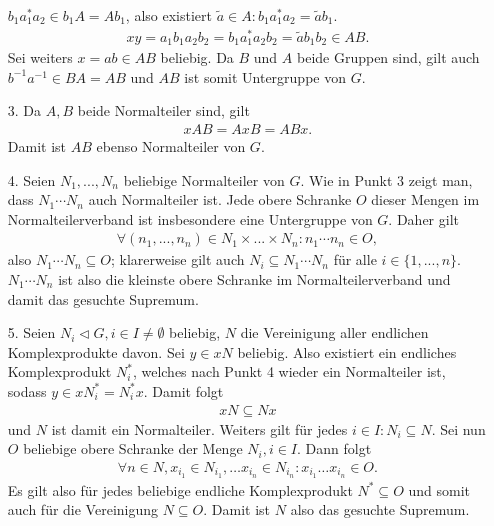 \begin{solution}
\begin{itemize}
  $b_1a_1^*a_2 \in b_1A = Ab_1$, also existiert $\widetilde{a} \in A: b_1a_1^*a_2 = \widetilde{a}b_1$.
  \begin{align*}
    xy = a_1b_1a_2b_2 = b_1a_1^*a_2b_2 = \widetilde{a}b_1b_2 \in AB.
  \end{align*}
  Sei weiters $x = ab \in AB$ beliebig. Da $B$ und $A$ beide Gruppen sind, gilt
  auch $b^{-1}a^{-1} \in BA = AB$ und $AB$ ist somit Untergruppe von $G$.
  \item [3.] Da $A,B$ beide Normalteiler sind, gilt
  \begin{align*}
    xAB = AxB = ABx.
  \end{align*}
  Damit ist $AB$ ebenso Normalteiler von $G$.
  \item [4.] Seien $N_1, ..., N_n$ beliebige Normalteiler von $G$. Wie in Punkt 3 zeigt man, dass $N_1\cdots N_n$ auch Normalteiler ist. Jede obere Schranke $O$ dieser Mengen im Normalteilerverband ist insbesondere eine Untergruppe von $G$. Daher gilt
  \begin{align*}
    \forall (n_1, ..., n_n) \in N_1 \times ... \times N_n: n_1\cdots n_n \in O,
  \end{align*}
  also $N_1\cdots N_n \subseteq O$;
  klarerweise gilt auch $N_i \subseteq N_1\cdots N_n$ für alle $i \in \{1,...,n\}$.
  $N_1\cdots N_n$ ist also die kleinste obere Schranke im Normalteilerverband und damit das gesuchte Supremum.
  \item [5.] Seien $N_i \vartriangleleft G, i \in I \neq \emptyset$ beliebig,
  $N$ die Vereinigung aller endlichen Komplexprodukte davon.
  Sei $y \in xN$ beliebig. Also existiert ein endliches Komplexprodukt $N_i^*$,
  welches nach Punkt 4 wieder ein Normalteiler ist, sodass $y \in xN_i^* = N_i^*x$.
  Damit folgt
  \begin{align*}
    xN \subseteq Nx
  \end{align*}
  und $N$ ist damit ein Normalteiler. Weiters gilt für jedes $i \in I: N_i \subseteq N$.
  Sei nun $O$ beliebige obere Schranke der Menge $N_i, i\in I$. Dann folgt
  \begin{align*}
    \forall n \in N, x_{i_1} \in N_{i_1},\dots x_{i_n} \in N_{i_n}: x_{i_1}\dots x_{i_n} \in O.
  \end{align*}
  Es gilt also für jedes beliebige endliche Komplexprodukt $N^* \subseteq O$
  und somit auch für die Vereinigung $N \subseteq O$.
  Damit ist $N$ also das gesuchte Supremum.
\end{itemize}
\end{solution}
